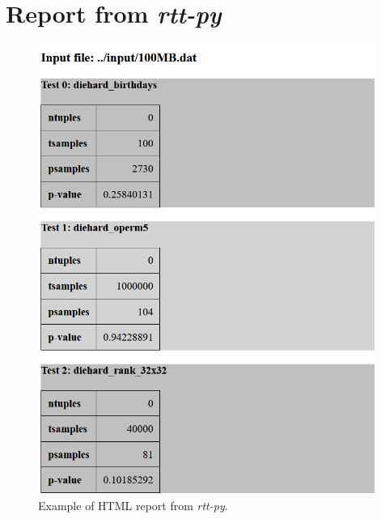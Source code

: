 \documentclass[
  digital,     %
  oneside,     %
  nosansbold,  %
  nocolorbold, %
  nolof,         %
  nolot,         %
]{fithesis4}
\begin{document}
\section{Report from \emph{rtt-py}} \label{append:rtt-py-output}
\begin{figure}[h!]
  \begin{center}
    \includegraphics[width=11cm]{figures/rtt/rtt-py-out.png}
  \end{center}
  \caption{Example of HTML report from \emph{rtt-py}.}
  \label{fig:rtt_py_output}
\end{figure}

\newpage
\end{document}
